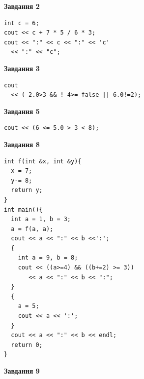 \documentclass[12pt, ukrainian]{article}
\begin{document}
{\begin {large}
\begin{minipage}[t]{7.0cm}
\end{minipage}
\vline \hspace{1mm}
\begin{minipage}[t]{11.0cm}

\begin{center}
\textbf{Завдання 2}
\end{center}
\vspace{-8mm}

\begin{verbatim}
int c = 6;
cout << c + 7 * 5 / 6 * 3;
cout << ":" << c << ":" << 'c' 
  << ":" << "c";
\end{verbatim}



\begin{center}
\textbf{Завдання 3}
\end{center}
\vspace{-8mm}

\begin{verbatim}
cout 
  << ( 2.0>3 && ! 4>= false || 6.0!=2);
\end{verbatim}



\begin{center}
\textbf{Завдання 5}
\end{center}
\vspace{-8mm}

\begin{verbatim}
cout << (6 <= 5.0 > 3 < 8);
\end{verbatim}



\begin{center}
\textbf{Завдання 8}
\end{center}
\vspace{-8mm}

\begin{verbatim}
int f(int &x, int &y){
  x = 7;
  y-= 8;
  return y;
}
int main(){
  int a = 1, b = 3;
  a = f(a, a);
  cout << a << ":" << b <<':';
  {
    int a = 9, b = 8;
    cout << ((a>=4) && ((b+=2) >= 3))
       << a << ":" << b << ":";
  }
  {
    a = 5;
    cout << a << ':';
  }
  cout << a << ":" << b << endl;
  return 0;
}
\end{verbatim}

\end{minipage}


\begin{minipage}[t]{7.0cm}

\begin{center}
\textbf{Завдання 9}
\end{center}
\vspace{-8mm}


\end{minipage}
\end{large}}
\end{document}
